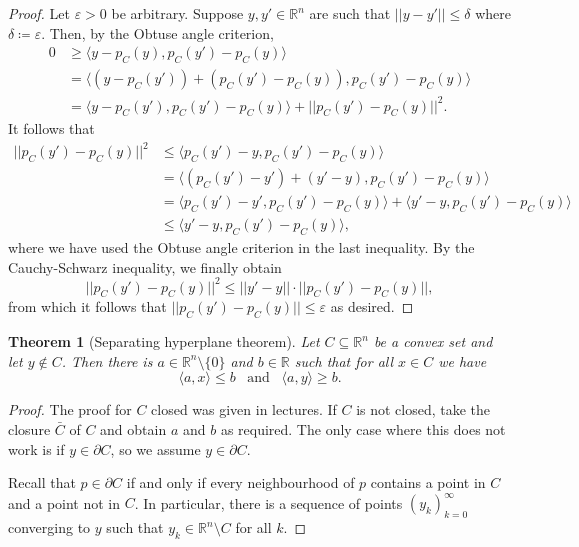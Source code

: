 \documentclass{report}
\theoremstyle{definition}
\theoremstyle{plain}
\newtheorem{thm}{Theorem}[section]
\theoremstyle{definition}
\begin{document}
	\begin{proof}
		Let $\varepsilon>0$ be arbitrary. Suppose $y,y'\in\mathbb{R}^n$ are such that $||y-y'||\leq \delta$ where $\delta\coloneqq \varepsilon$. Then, by the Obtuse angle criterion, 
		\begin{align*}
			0&\geq \langle y - p_C(y), p_C(y') - p_C(y)\rangle\\
			&= \langle (y-p_C(y')) +(p_C(y') - p_C(y)), p_C(y') - p_C(y)\rangle\\
			&= \langle y-p_C(y'), p_C(y') - p_C(y)\rangle + ||p_C(y') - p_C(y)||^2.
		\end{align*}
		It follows that
		\begin{align*}
			||p_C(y') - p_C(y)||^2 &\leq \langle p_C(y') - y, p_C(y') - p_C(y)\rangle\\
			&= \langle (p_C(y') - y') +(y'- y), p_C(y') - p_C(y)\rangle\\
			&= \langle p_C(y') - y', p_C(y') - p_C(y)\rangle + \langle y'- y, p_C(y') - p_C(y)\rangle\\
			&\leq \langle y'- y, p_C(y') - p_C(y)\rangle,
		\end{align*}
		where we have used the Obtuse angle criterion in the last inequality. By the Cauchy-Schwarz inequality, we finally obtain
		\[
			||p_C(y') - p_C(y)||^2 \leq ||y'- y|| \cdot ||p_C(y') - p_C(y)||,
		\]
		from which it follows that $||p_C(y') - p_C(y)|| \leq \varepsilon$ as desired.
	\end{proof}
	\begin{thm}[Separating hyperplane theorem]
		Let $C \subseteq \mathbb{R}^n$ be a convex set and let $y\notin C$. Then there is $a\in\mathbb{R}^n\setminus\{0\}$ and $b\in \mathbb{R}$ such that for all $x\in C$ we have
		\[
			\langle a, x\rangle \leq b  \,\,\,\text{ and }\,\,\, \langle a,y\rangle\geq b.
		\]
	\end{thm}
	\begin{proof}
		The proof for $C$ closed was given in lectures. If $C$ is not closed, take the closure $\bar{C}$ of $C$ and obtain $a$ and $b$ as required. The only case where this does not work is if $y \in \partial C$, so we assume $y\in \partial C$.
		
		Recall that $p\in \partial C$ if and only if every neighbourhood of $p$ contains a point in $C$ and a point not in $C$. In particular, there is a sequence of points $(y_k)_{k=0}^{\infty}$ converging to $y$ such that $y_k\in \mathbb{R}^n\setminus C$ for all $k$.
	\end{proof}
\end{document}
